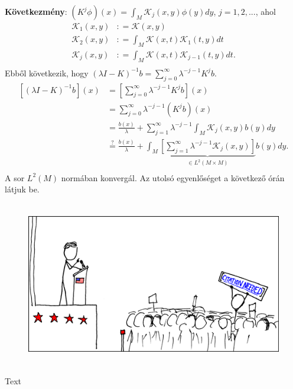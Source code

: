 \documentclass[12pt,a4paper]{scrartcl}
\newenvironment{ajanlofig}{\begin{figure}\begin{center}}{
\end{center}\end{figure}}
\begin{document}
\textbf{Következmény}:
\(\left( {K^{j}\phi} \right)\left( x \right) = {\int_{M}{\mathcal{K}_{j}\left( {x,y} \right)\phi\left( y \right)dy}}\),
\(j = 1,2,...\), ahol \[\begin{aligned}
  {\mathcal{K}_1}\left( {x,y} \right) & : = \mathcal{K}\left( {x,y} \right) \\ 
  {\mathcal{K}_2}\left( {x,y} \right) & : = \int_M {\mathcal{K}\left( {x,t} \right){\mathcal{K}_1}\left( {t,y} \right)dt}  \\ 
  {\mathcal{K}_j}\left( {x,y} \right) & : = \int_M {\mathcal{K}\left( {x,t} \right){\mathcal{K}_{j - 1}}\left( {t,y} \right)dt} . \\ 
\end{aligned} \] Ebből következik, hogy
\(\left( {\lambda I - K} \right)^{- 1}b = {\sum\limits_{j = 0}^{\infty}{\lambda^{- j - 1}K^{j}b}}\).
\[\begin{aligned}
  \left[ {{{\left( {\lambda I - K} \right)}^{ - 1}}b} \right]\left( x \right) &  = \left[ {\mathop \sum \limits_{j = 0}^\infty  {\lambda ^{ - j - 1}}{K^j}b} \right]\left( x \right) \\ 
   &  = \mathop \sum \limits_{j = 0}^\infty  {\lambda ^{ - j - 1}}\left( {{K^j}b} \right)\left( x \right) \\ 
   &  = \frac{{b\left( x \right)}}{\lambda } + \mathop \sum \limits_{j = 1}^\infty  {\lambda ^{ - j - 1}}\int_M {{\mathcal{K}_j}\left( {x,y} \right)b\left( y \right)dy}  \\ 
   & \mathop  = \limits^? \frac{{b\left( x \right)}}{\lambda } + \int_M {\underbrace {\left[ {\mathop \sum \limits_{j = 1}^\infty  {\lambda ^{ - j - 1}}{\mathcal{K}_j}\left( {x,y} \right)} \right]}_{ \in {L^2}\left( {M \times M} \right)}b\left( y \right)dy} . \\ 
\end{aligned} \] A sor \(L^{2}\left( M \right)\) normában konvergál. Az
utolsó egyenlőséget a következő órán látjuk be.

\begin{ajanlo}

\begin{ajanlofig}

\href{https://xkcd.com}{\includegraphics[width=5.20833in,height=2.82292in]{wikipedian_protester.png}}

\end{ajanlofig}

Text

\end{ajanlo}
\end{document}
